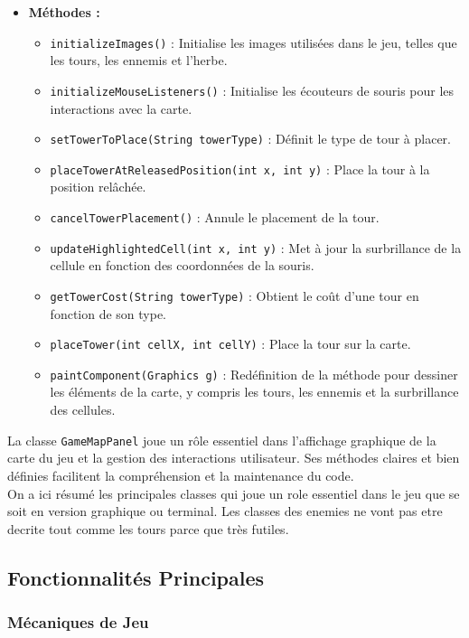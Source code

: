 \documentclass{article}
\begin{document}
\begin{itemize}
\item \textbf{Méthodes :}
\begin{itemize}
    \item \texttt{initializeImages()} : Initialise les images utilisées dans le jeu, telles que les tours, les ennemis et l'herbe.
    \item \texttt{initializeMouseListeners()} : Initialise les écouteurs de souris pour les interactions avec la carte.
    \item \texttt{setTowerToPlace(String towerType)} : Définit le type de tour à placer.
    \item \texttt{placeTowerAtReleasedPosition(int x, int y)} : Place la tour à la position relâchée.
    \item \texttt{cancelTowerPlacement()} : Annule le placement de la tour.
    \item \texttt{updateHighlightedCell(int x, int y)} : Met à jour la surbrillance de la cellule en fonction des coordonnées de la souris.
    \item \texttt{getTowerCost(String towerType)} : Obtient le coût d'une tour en fonction de son type.
    \item \texttt{placeTower(int cellX, int cellY)} : Place la tour sur la carte.
    \item \texttt{paintComponent(Graphics g)} : Redéfinition de la méthode pour dessiner les éléments de la carte, y compris les tours, les ennemis et la surbrillance des cellules.
\end{itemize}
\end{itemize}

La classe \texttt{GameMapPanel} joue un rôle essentiel dans l'affichage graphique de la carte du jeu et la gestion des interactions utilisateur. Ses méthodes claires et bien définies facilitent la compréhension et la maintenance du code.\\

On a ici résumé les principales classes qui joue un role essentiel dans le jeu que se soit en version graphique ou terminal. Les classes des enemies ne vont pas etre decrite tout comme les tours parce que très futiles.

\subsection{Fonctionnalités Principales}

\subsubsection*{Mécaniques de Jeu}
\end{document}
